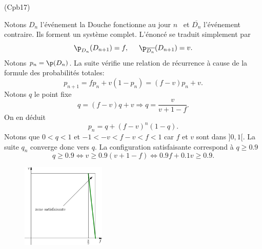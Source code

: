 \begin{tiny}(Cpb17)\end{tiny} Notons $D_n$ l'événement \og la Douche fonctionne au jour $n$\fg~ et $\overline{D_n}$ l'événement contraire. Ils forment un système complet. L'énoncé se traduit simplement par
\[
  \p_{D_n}(D_{n+1}) = f, \hspace{0.5cm} \p_{\overline{D_n}}(D_{n+1}) = v.
\]
Notons $p_n = \p(D_n)$. La suite vérifie une relation de récurrence à cause de la formule des probabilités totales:
\[
  p_{n+1} = f p_n + v(1-p_n)
  = (f-v)p_n + v.
\]
Notons $q$ le point fixe
\[
  q = (f-v)q+v 
  \Rightarrow
  q = \frac{v}{v + 1 -f}.
\]
On en déduit
\[
  p_n = q + (f-v)^n(1-q).
\]
Notons que $0 < q <1$ et $-1< -v < f-v < f <1$ car $f$ et $v$ sont dans $]0,1[$.\newline
La suite $q_n$ converge donc vers $q$.\newline
La configuration satisfaisante correspond à $q \geq 0.9$
\[
  q \geq 0.9 \Leftrightarrow v \geq 0.9(v+1-f)
  \Leftrightarrow 0.9 f + 0.1v \geq 0.9.
\]
\begin{figure}[h!]
  \centering
  \includegraphics[width=4cm]{Cpb17_1.pdf}
\end{figure}
